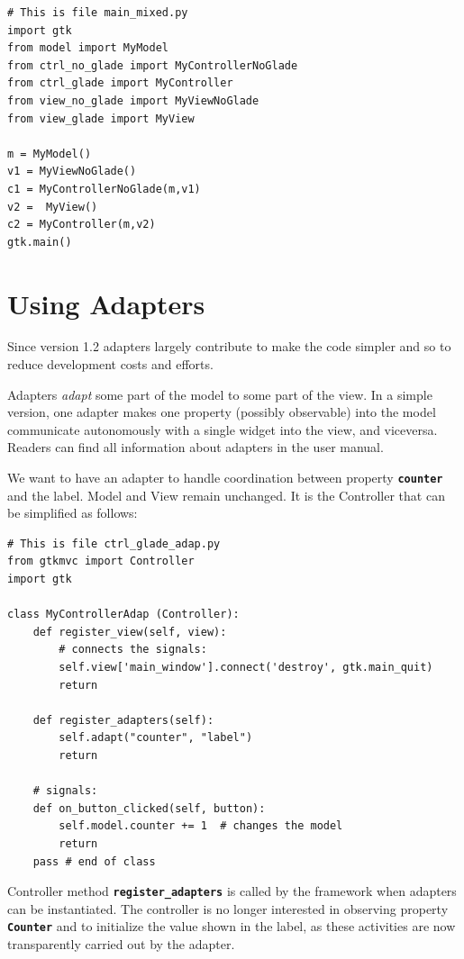 \documentclass{article}
\newcommand{\codename}[1]{\texttt{\bfseries \textcolor {codecolor}{#1}}\xspace}
\newcommand{\codesize}{\small } %
\begin{document}
{ \codesize 
\begin{verbatim}       
# This is file main_mixed.py
import gtk
from model import MyModel
from ctrl_no_glade import MyControllerNoGlade
from ctrl_glade import MyController
from view_no_glade import MyViewNoGlade
from view_glade import MyView

m = MyModel()
v1 = MyViewNoGlade()
c1 = MyControllerNoGlade(m,v1)
v2 =  MyView()
c2 = MyController(m,v2)
gtk.main()
\end{verbatim}
}


\section{Using Adapters}
Since version 1.2 adapters largely contribute to make the code
simpler and so to reduce development costs and efforts.

\smallskip
Adapters \emph{adapt} some part of the model to some part of the
view. In a simple version, one adapter makes one property (possibly
observable) into the model communicate autonomously with a single
widget into the view, and viceversa. Readers can find all
information about adapters in the user manual.

\bigskip
We want to have an adapter to handle coordination between property
\codename{counter} and the label. Model and View remain
unchanged. It is the Controller that can be simplified as follows:

{ \codesize 
\begin{verbatim}   
# This is file ctrl_glade_adap.py
from gtkmvc import Controller
import gtk

class MyControllerAdap (Controller):
    def register_view(self, view):
        # connects the signals:
        self.view['main_window'].connect('destroy', gtk.main_quit)
        return

    def register_adapters(self):
        self.adapt("counter", "label")
        return
       
    # signals:
    def on_button_clicked(self, button):
        self.model.counter += 1  # changes the model
        return    
    pass # end of class
\end{verbatim}
} 

Controller method \codename{register\_adapters} is called by the
framework when adapters can be instantiated. The controller is no
longer interested in observing property \codename{Counter} and to
initialize the value shown in the label, as these activities are now
transparently carried out by the adapter.
\end{document}
